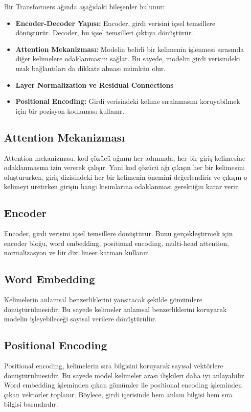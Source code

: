 Bir Transformers ağında aşağıdaki bileşenler bulunur:
\begin{itemize}
    \item \textbf{Encoder-Decoder Yapısı:} Encoder, girdi verisini içsel temsillere dönüştürür. Decoder, bu içsel temsilleri çıktıya dönüştürür.
    \item \textbf{Attention Mekanizması:} Modelin belirli bir kelimenin işlenmesi sırasında diğer kelimelere odaklanmasını sağlar. Bu sayede, modelin girdi verisindeki uzak bağlantıları da dikkate alması mümkün olur.
    \item \textbf{Layer Normalization ve Residual Connections}
    \item \textbf{Positional Encoding:} Girdi verisindeki kelime sıralamasını koruyabilmek için bir pozisyon kodlaması kullanır.
\end{itemize}

\subsection{Attention Mekanizması}
Attention mekanizması, kod çözücü ağının her adımında, her bir giriş kelimesine odaklanmasına izin vererek çalışır. Yani kod çözücü ağı çıkışın her bir kelimesini oluştururken, giriş dizisindeki her bir kelimenin önemini değerlendirir ve çıkışın o kelimeyi üretirken girişin hangi kısımlarına odaklanması gerektiğin karar verir.

\subsection{Encoder}
Encoder, girdi verisini içsel temsillere dönüştürür. Bunu gerçekleştirmek için encoder bloğu, word embedding, positional encoding, multi-head attention, normalizasyon ve bir dizi lineer katman kullanır.

\subsection{Word Embedding}
Kelimelerin anlamsal benzerliklerini yansıtacak şekilde gömümlere dönüştürülmesidir. Bu sayede kelimeler anlamsal benzerliklerini koruyarak modelin işleyebileceği sayısal verilere dönüştürülür.

\subsection{Positional Encoding}
Positional encoding, kelimelerin sıra bilgisini koruyarak sayısal vektörlere dönüştürülmesidir. Bu sayede model kelimeler arası ilişkileri daha iyi anlayabilir. Word embedding işleminden çıkan gömümler ile positional encoding işleminden çıkan vektörler toplanır. Böylece, girdi içerisinde hem anlam bilgisi hem sıra bilgisi barındırılır.

